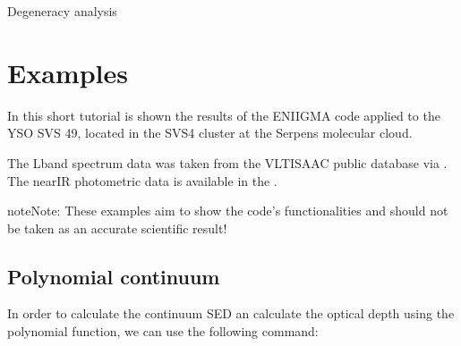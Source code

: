 \documentclass[letterpaper,10pt,english]{sphinxmanual}
\begin{document}
Degeneracy analysis

\begin{sphinxVerbatim}[commandchars=\\\{\}]
   
\end{sphinxVerbatim}


\section{Examples}
\label{\detokenize{Examples:examples}}\label{\detokenize{Examples::doc}}
In this short tutorial is shown the results of the ENIIGMA code applied to the YSO SVS 4\sphinxhyphen{}9, located in the SVS4 cluster at the Serpens molecular cloud.

The L\sphinxhyphen{}band spectrum data was taken from the VLT\sphinxhyphen{}ISAAC public database via . The near\sphinxhyphen{}IR
photometric data is available in the .

\begin{sphinxadmonition}{note}{Note:}
These examples aim to show the code’s functionalities and should not be taken as an accurate scientific result!
\end{sphinxadmonition}


\subsection{Polynomial continuum}
\label{\detokenize{Examples:polynomial-continuum}}
In order to calculate the continuum SED an calculate the optical depth using the polynomial function, we can use the following command:

\begin{sphinxVerbatim}[commandchars=\\\{\}]
   
  
      \PYG{p}{[}\PYG{p}{[} \PYG{p}{]} \PYG{p}{[} \PYG{p}{]}\PYG{p}{]}
\end{sphinxVerbatim}
\end{document}
